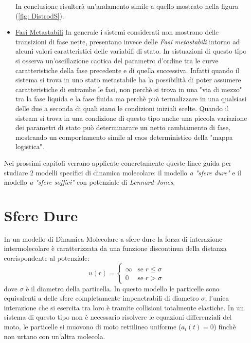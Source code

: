 \documentclass[11pt]{article}
\theoremstyle{plain}
\theoremstyle{remark}
\begin{document}
\begin{itemize}
In conclusione risulterà un'andamento simile a quello mostrato nella figura (\ref{fig: DistrodS}).


\item \underline{Fasi Metastabili}\newline
In generale i sistemi considerati non mostrano delle transizioni di fase nette, presentano invece delle \emph{Fasi metastabili} intorno ad alcuni valori caratteristici delle variabili di stato.
In sistuazioni di questo tipo si osserva un'oscillazione caotica  del parametro d'ordine tra le curve caratteristiche della fase precedente e di quella successiva.
Infatti quando il sistema si trova in uno stato metastabile ha la possibilità di poter assumere caratteristiche di entrambe le fasi, non perchè si trova in una "via di mezzo" tra la fase liquida e la fase fluida ma perchè può termalizzare in una qualsiasi delle due a seconda di quali siano le condizioni iniziali scelte.
Quando il sisteam si trova in una condizione di questo tipo anche una piccola variazione dei parametri di stato può determinarare un netto cambiamento di fase, mostrando un comportamento simile al caos deterministico della "mappa logistica".

\end{itemize}
Nei prossimi capitoli verrano applicate concretamente queste linee guida per studiare 2 modelli specifici di dinamica molecolare: il modello \emph{a "sfere dure"} e il modello \emph{a "sfere soffici"} con potenziale di \emph{ Lennard-Jones}.

\clearpage
\section{Sfere Dure}\label{Dure}
In un modello di Dinamica Molecolare a sfere dure la forza di interazione intermolecolare è caratterizzata da una funzione discontinua della distanza corrispondente al potenziale:
\begin{equation}
u(r) =	\begin{cases} 
			\infty  & \mbox{se }r\leq \sigma \\
			0 		& \mbox{se }r> \sigma
		\end{cases}
\end{equation}
dove $\sigma$ è il diametro della particella.
In questo modello le particelle sono equivalenti a delle sfere completamente impenetrabili di diametro $\sigma$, l'unica interazione che si esercita tra loro è tramite collisioni totalmente elastiche.
\medskip \newline 
In un sistema di questo tipo non è necessario risolvere le equazioni differenziali del moto, le particelle si muovono di moto rettilineo uniforme ($a_i(t) = 0$) finchè non urtano con un'altra molecola.
\end{document}
